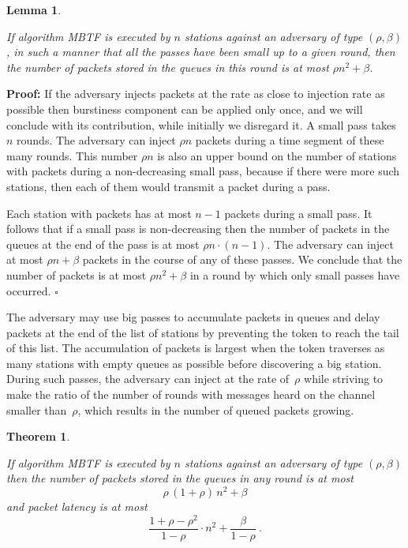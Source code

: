 \documentclass[11pt]{article}
\newcommand{\qed}{\hfill $\square$}
\newtheorem{theorem}{Theorem}
\newtheorem{lemma}{Lemma}
\newenvironment{proof}{\noindent\textbf{Proof: }}{\qed \smallbreak}
\begin{document}

\begin{lemma}
\label{lem:queues-MBTF-small}

If algorithm \textsc{MBTF} is executed by $n$ stations against an adversary of type $(\rho,\beta)$, in such a manner that all the passes have been small up to a given round, then the number of packets stored in the queues in this round is at most $\rho  n^2 + \beta$.
\end{lemma}

\begin{proof}
If the adversary injects packets at the rate as close to injection rate as possible then burstiness component can be applied only once, and we will conclude with its contribution, while initially we disregard it.
A small pass takes $n$ rounds.
The adversary can inject $\rho n$ packets during a time segment of these many rounds. 
This number $\rho n$ is also an upper bound on the number of stations with packets during a non-decreasing small pass, because if there were more such stations, then each of them would transmit a packet during a pass.

Each station with packets has at most $n-1$ packets during a small pass.  
It follows that if a small pass is non-decreasing then the number of packets in the queues at the end of the pass is at most $\rho n\cdot(n-1)$.
The adversary can inject at most $\rho n +\beta$ packets in the course of any of these passes.
We conclude that the number of packets is at most $\rho  n^2 + \beta$ in a round by which only  small passes have occurred.
\end{proof} 

The adversary may use big passes to accumulate packets in queues and delay  packets at the end of the list of stations by preventing the token to reach the tail of this list.
The accumulation of packets is largest when the token traverses as many stations with empty queues as possible before discovering a big station.
During such passes, the adversary can inject at the rate of~$\rho$ while striving to make the ratio of the number of rounds with messages heard on the channel smaller than~$\rho$, which results in the number of queued packets growing.


\begin{theorem}
\label{thm:MBTF}

If algorithm  \textsc{MBTF} is executed by $n$ stations against an adversary of type $(\rho,\beta)$  then the number of packets stored in the queues  in any round is at most 
\begin{equation}        
\label{eqn:MBTF-packets}
\rho \,(1+\rho)\,n^2 + \beta 
\end{equation}
and packet latency is at most
\begin{equation}
\label{eqn:MBTF-latency}
\frac{1+\rho -\rho^2}{1-\rho} \cdot n^2 + \frac{\beta}{1-\rho} 
\ .
\end{equation}
\end{theorem}
\end{document}
